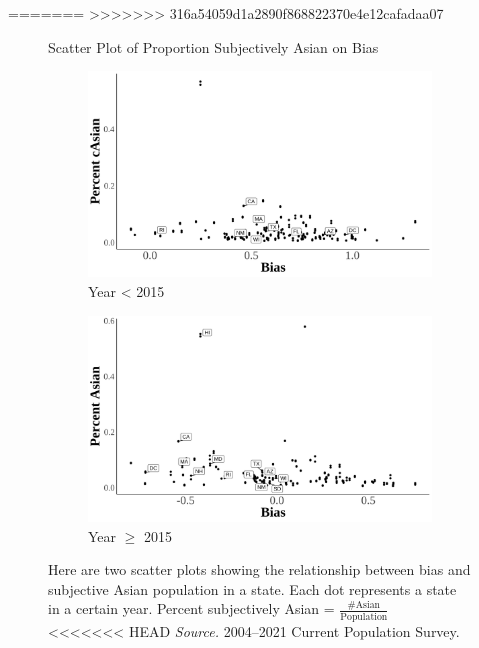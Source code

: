 =======
>>>>>>> 316a54059d1a2890f868822370e4e12cafadaa07
\begin{figure}[H]
    \centering
    \caption{Scatter Plot of Proportion Subjectively Asian on Bias}
    \label{scatter-plot-1}
    \begin{subfigure}{.9\textwidth}
    \caption{Year < 2015}
    \centering
    \includegraphics[width=.9\linewidth]{scatter-plot-bias-Asian-less2015.png}
    \end{subfigure}
    \centering
    \begin{subfigure}{.9\textwidth}
    \caption{Year $\geq$ 2015}
    \centering
    \includegraphics[width=.9\linewidth]{scatter-plot-bias-Asian-great2015.png}
    \end{subfigure}
    \caption*{\footnotesize{Here are two scatter plots showing the relationship between bias and subjective Asian population in a state. Each dot represents a state in a certain year. Percent subjectively Asian = $\frac{\# \text{Asian}}{\text{Population}}$ \\
<<<<<<< HEAD
    \emph{Source.} 2004--2021 Current Population Survey.}}
    \end{figure}

